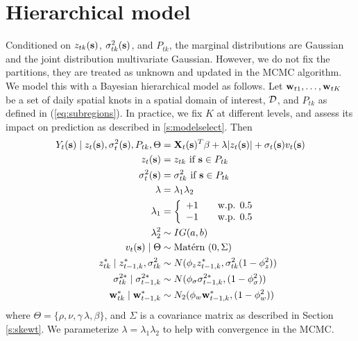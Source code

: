 \documentclass[11pt]{article}
\begin{document}
\section{Hierarchical model}\label{s:hier}
Conditioned on $z_{tk}(\mbox{\bf s})$, $\sigma^2_{tk}(\mbox{\bf s})$, and $P_{tk}$, the marginal distributions are Gaussian and the joint distribution multivariate Gaussian.
However, we do not fix the partitions, they are treated as unknown and updated in the MCMC algorithm.
We model this with a Bayesian hierarchical model as follows.
Let $\mbox{\bf w}_{t1}, \ldots, \mbox{\bf w}_{tK}$ be a set of daily spatial knots in a spatial domain of interest, ${\cal D}$, and $P_{tk}$ as defined in (\ref{eq:subregions}).
In practice, we fix $K$ at different levels, and assess its impact on prediction as described in \ref{s:modelselect}.
Then
\begin{align}
   Y_t(\mbox{\bf s}) \mid z_{t}(\mbox{\bf s}), \sigma_t^2(\mbox{\bf s}), P_{tk}, \Theta &= \mbox{\bf X}_t(\mbox{\bf s})^T \beta + \lambda |z_t(\mbox{\bf s})| + \sigma_t(\mbox{\bf s}) v_t(\mbox{\bf s}) \label{eq:hier}\\
   z_t(\mbox{\bf s}) &= z_{tk} \text{ if } \mbox{\bf s} \in P_{tk}\nonumber\\
   \sigma^2_{t}(\mbox{\bf s}) &= \sigma^2_{tk} \text{ if } \mbox{\bf s} \in P_{tk}\nonumber\\
   \lambda &= \lambda_1 \lambda_2\nonumber\\
   \lambda_1 &= \left\{ \begin{array}{ll}
      +1 \quad & \text{w.p. } 0.5\\
      -1 \quad & \text{w.p. } 0.5
   \end{array}\right.\nonumber\\
   \lambda^2_2 & \sim IG(a, b)\nonumber\\
   v_t(\mbox{\bf s}) \mid \Theta &\sim \mbox{Mat$\acute{\mbox{e}}$rn }(0, \Sigma)\nonumber\\
   z^*_{tk} \mid z^*_{t-1, k}, \sigma^2_{tk} &\sim N(\phi_z z^*_{t-1, k}, \sigma^2_{tk} (1 - \phi_z^2))\nonumber\\
   \sigma^{2*}_{tk} \mid \sigma^{2*}_{t-1, k} &\sim N(\phi_\sigma \sigma^{2*}_{t-1, k}, (1 - \phi_\sigma^2))\nonumber\\
   \mbox{\bf w}^*_{tk} \mid \mbox{\bf w}^*_{t-1, k} &\sim N_2(\phi_w \mbox{\bf w}^*_{t-1, k}, (1 - \phi_w^2)) \nonumber
\end{align}
where $\Theta = \{\rho, \nu, \gamma\, \lambda, \beta\}$, and $\Sigma$ is a \Matern covariance matrix as described in Section \ref{s:skewt}.
We parameterize $\lambda = \lambda_1 \lambda_2$ to help with convergence in the MCMC.
\end{document}
